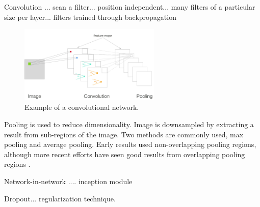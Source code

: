 Convolution\cite{lecun1995comparison,lecun2010convolutional,krizhevsky2012imagenet} ... scan a filter... position independent... many filters of a particular size per layer... filters trained through backpropagation


\begin{figure}[t]
  \begin{center}
    \includegraphics[width=0.6\textwidth]{figures/figures/convnet.png}
  \end{center}
  \caption[Example of a convolutional network ]{Example of a convolutional network.}

  \label{convnet}
\end{figure}



Pooling is used to reduce dimensionality. \cite{lecun2010convolutional} Image is downsampled by extracting a result from sub-regions of the image.  Two methods are commonly used, max pooling and average pooling.  Early results used non-overlapping pooling regions, although more recent efforts have seen good results from overlapping pooling regions \cite{krizhevsky2012imagenet}.




Network-in-network\cite{lin2013network} .... inception module \cite{szegedy2014going}

Dropout... regularization technique. \cite{hinton2014dropout}



